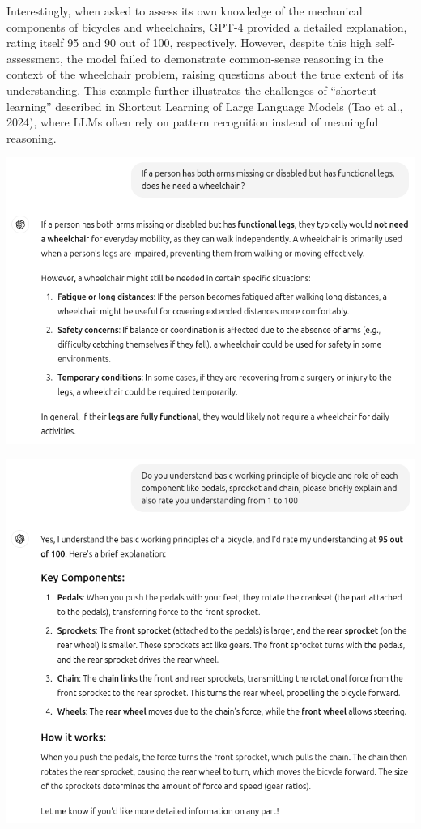 \documentclass[11pt]{scrartcl}
\begin{document}
Interestingly, when asked to assess its own knowledge of the mechanical components of bicycles and wheelchairs, GPT-4 provided a detailed explanation, rating itself 95 and 90 out of 100, respectively. However, despite this high self-assessment, the model failed to demonstrate common-sense reasoning in the context of the wheelchair problem, raising questions about the true extent of its understanding. This example further illustrates the challenges of “shortcut learning” described in Shortcut Learning of Large Language Models (Tao et al., 2024)\cite{ref5}, where LLMs often rely on pattern recognition instead of meaningful reasoning.

\begin{center}
\includegraphics[scale=0.39]{wheelchair_problem_0.png}
\end{center}

\begin{center}
\includegraphics[scale=0.36]{wheelchair_problem_8a.png}
\end{center}
\end{document}
